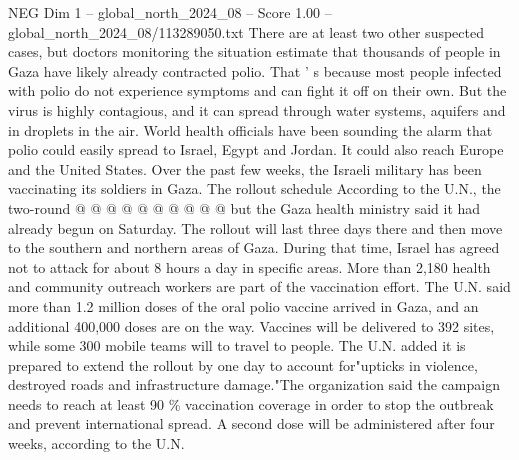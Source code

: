 \begin{textsample}{NEG Dim 1 – global\_north\_2024\_08 – Score 1.00 – global\_north\_2024\_08/113289050.txt}
There are at least two other suspected cases, but doctors monitoring the situation estimate that thousands of people in Gaza have likely already contracted polio.
That ' s because most people infected with polio do not experience symptoms and can fight it off on their own.
But the virus is highly contagious, and it can spread through water systems, aquifers and in droplets in the air.
World health officials have been sounding the alarm that polio could easily spread to Israel, Egypt and Jordan.
It could also reach Europe and the United States.
Over the past few weeks, the Israeli military has been vaccinating its soldiers in Gaza.
The rollout schedule According to the U.N., the two-round @ @ @ @ @ @ @ @ @ @ but the Gaza health ministry said it had already begun on Saturday.
The rollout will last three days there and then move to the southern and northern areas of Gaza.
During that time, Israel has agreed not to attack for about 8 hours a day in specific areas.
More than 2,180 health and community outreach workers are part of the vaccination effort.
The U.N. said more than 1.2 million doses of the oral polio vaccine arrived in Gaza, and an additional 400,000 doses are on the way.
Vaccines will be delivered to 392 sites, while some 300 mobile teams will to travel to people.
The U.N. added it is prepared to extend the rollout by one day to account for"upticks in violence, destroyed roads and infrastructure damage."The organization said the campaign needs to reach at least 90 \% vaccination coverage in order to stop the outbreak and prevent international spread.
A second dose will be administered after four weeks, according to the U.N.

\end{textsample}
